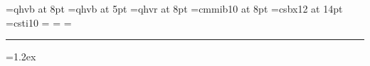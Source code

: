 \def\MakeAfterExpKern{\kern-.1em}
\def\MakeBassRaise{-.5ex}
\newfam\ChordFam
\font\ChordFontText=qhvb at 8pt
\font\ChordFontExp=qhvb at 5pt
\font\ChordFontBass=qhvr at 8pt
\font\CHSymFont=cmmib10 at 8pt
\font\SongNameFont=csbx12 at 14pt
\font\AuthorFont=csti10
%
\textfont\ChordFam=\ChordFontText
\scriptfont\ChordFam=\ChordFontExp
\scriptscriptfont\ChordFam=\ChordFontBass
\def\setformatA{\fam=\ChordFam\textstyle} 
\def\setformatB{\fam=\ChordFam\scriptstyle}
\def\setformatC{\fam=\ChordFam\scriptscriptstyle}
\def\MakeSongHeader#1#2#3#4#5{{
\noindent\SongNameFont #1 \hfill #5\par%
\noindent\AuthorFont #2\par}}
%
\def\MakeParBegin{%
  \ifx V\TypeOfVerse \hbox to \parindent {\MakeVerse\hfil}%
  \else\ifx R\TypeOfVerse \hbox to \parindent {\MakeRef\hfil}%
  \else\ifx M\TypeOfVerse%
  \else\hbox{\hskip\parindent}%
  \fi\fi\fi}
\def\MakeVerse{\NumOfVerse.}
\def\MakeRef{R\NumOfVerse:}
%
\def\MakeLineIndent{%
  \ifx M\TypeOfVerse%
  \else\hbox{\hskip\parindent}\fi%
}  
\def\MakeVerse{\NumOfVerse.}
\def\MakeRef{R\NumOfVerse:}


\hrule

%
%
\parindent=20pt
\parskip=1.2ex

\bye
